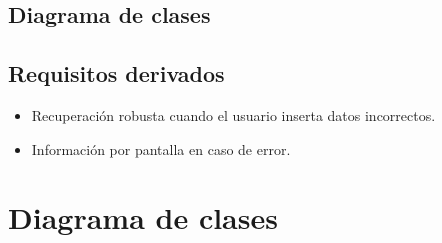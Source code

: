 \documentclass[12pt, a4paper, titlepage]{article}
\begin{document}
\subsection{Diagrama de clases}

\subsection{Requisitos derivados}

\begin{itemize}
	\item Recuperación robusta cuando el usuario inserta datos incorrectos.
	\item Información por pantalla en caso de error.
\end{itemize}


\section{Diagrama de clases}
\end{document}
